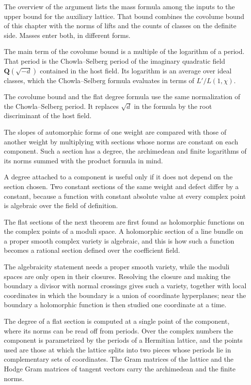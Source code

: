 The overview of the argument lists the mass formula among the inputs to the upper bound for
the auxiliary lattice. That bound combines the covolume bound of this chapter with the norms
of lifts and the counts of classes on the definite side. Masses enter both, in different
forms.

The main term of the covolume bound is a multiple of the logarithm of a period. That period
is the Chowla--Selberg period of the imaginary quadratic field $\mathbf Q(\sqrt{-d})$
contained in the host field. Its logarithm is an average over ideal classes, which the
Chowla--Selberg formula evaluates in terms of $L'/L(1,\chi)$.

The covolume bound and the flat degree formula use the same normalization of the
Chowla--Selberg period. It replaces $\sqrt d$ in the formula by the root discriminant of
the host field.

The slopes of automorphic forms of one weight are compared with those of another weight by
multiplying with sections whose norms are constant on each component. Such a section has a
degree, the archimedean and finite logarithms of its norms summed with the product formula in
mind.

A degree attached to a component is useful only if it does not depend on the section chosen.
Two constant sections of the same weight and defect differ by a constant, because a function
with constant absolute value at every complex point is algebraic over the field of definition.

The flat sections of the next theorem are first found as holomorphic functions on the complex
points of a moduli space. A holomorphic section of a line bundle on a proper smooth complex
variety is algebraic, and this is how such a function becomes a rational section defined over the
coefficient field.

The algebraicity statement needs a proper smooth variety, while the moduli spaces are only open in
their closures. Resolving the closure and making the boundary a divisor with normal crossings gives
such a variety, together with local coordinates in which the boundary is a union of coordinate
hyperplanes; near the boundary a holomorphic function is then studied one coordinate at a time.

The degree of a flat section is computed at a single point of the component, where its norms can
be read off from periods. Over the complex numbers the component is parametrized by the periods of
a Hermitian lattice, and the points used are those at which the lattice splits into two pieces whose
periods lie in complementary sets of coordinates. The Gram matrices of the lattice and the Hodge
Gram matrices of tangent vectors carry the archimedean and the finite norms.

